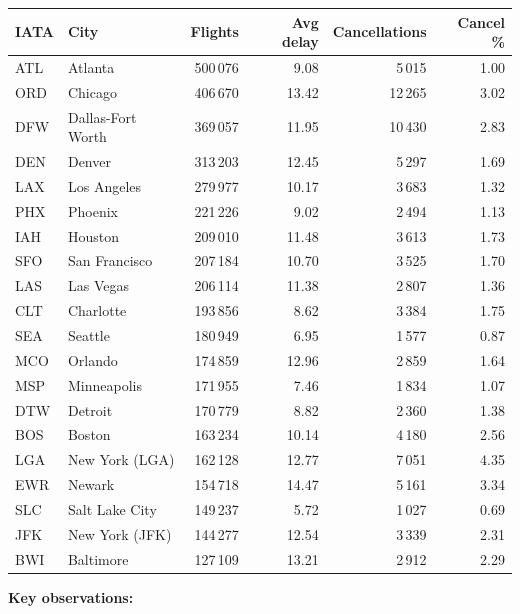 \documentclass[12pt,a4paper]{article}
\begin{document}
\begin{center}
\small
\begin{tabular}{llrrrr}
\toprule
\textbf{IATA} & \textbf{City} & \textbf{Flights} & \textbf{Avg delay} & \textbf{Cancellations} & \textbf{Cancel \%} \\
\midrule
ATL & Atlanta           & 500\,076 &  9.08 &  5\,015 & 1.00 \\
ORD & Chicago           & 406\,670 & 13.42 & 12\,265 & 3.02 \\
DFW & Dallas-Fort Worth & 369\,057 & 11.95 & 10\,430 & 2.83 \\
DEN & Denver            & 313\,203 & 12.45 &  5\,297 & 1.69 \\
LAX & Los Angeles       & 279\,977 & 10.17 &  3\,683 & 1.32 \\
PHX & Phoenix           & 221\,226 &  9.02 &  2\,494 & 1.13 \\
IAH & Houston           & 209\,010 & 11.48 &  3\,613 & 1.73 \\
SFO & San Francisco     & 207\,184 & 10.70 &  3\,525 & 1.70 \\
LAS & Las Vegas         & 206\,114 & 11.38 &  2\,807 & 1.36 \\
CLT & Charlotte         & 193\,856 &  8.62 &  3\,384 & 1.75 \\
SEA & Seattle           & 180\,949 &  6.95 &  1\,577 & 0.87 \\
MCO & Orlando           & 174\,859 & 12.96 &  2\,859 & 1.64 \\
MSP & Minneapolis       & 171\,955 &  7.46 &  1\,834 & 1.07 \\
DTW & Detroit           & 170\,779 &  8.82 &  2\,360 & 1.38 \\
BOS & Boston            & 163\,234 & 10.14 &  4\,180 & 2.56 \\
LGA & New York (LGA)    & 162\,128 & 12.77 &  7\,051 & 4.35 \\
EWR & Newark            & 154\,718 & 14.47 &  5\,161 & 3.34 \\
SLC & Salt Lake City    & 149\,237 &  5.72 &  1\,027 & 0.69 \\
JFK & New York (JFK)    & 144\,277 & 12.54 &  3\,339 & 2.31 \\
BWI & Baltimore         & 127\,109 & 13.21 &  2\,912 & 2.29 \\
\bottomrule
\end{tabular}
\end{center}

\textbf{Key observations:}
\end{document}
